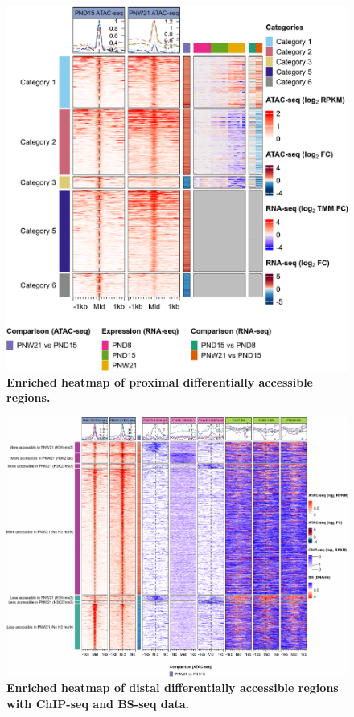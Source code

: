 \documentclass[12pt,twoside]{reedthesis}
\begin{document}
\begin{figure}[H]

{\centering \includegraphics{thesis_files/figure-latex/dn5-1} 

}

\caption[Enriched heatmap of proximal DARs]{\textbf{Enriched heatmap of proximal differentially accessible regions.}}\label{fig:dn5}
\end{figure}

\begin{figure}[H]

{\centering \includegraphics{thesis_files/figure-latex/dn6-1} 

}

\caption[Enriched heatmap of distal DARs with ChIP-seq and BS-seq data]{\textbf{Enriched heatmap of distal differentially accessible regions with ChIP-seq and BS-seq data.}}\label{fig:dn6}
\end{figure}
\end{document}
